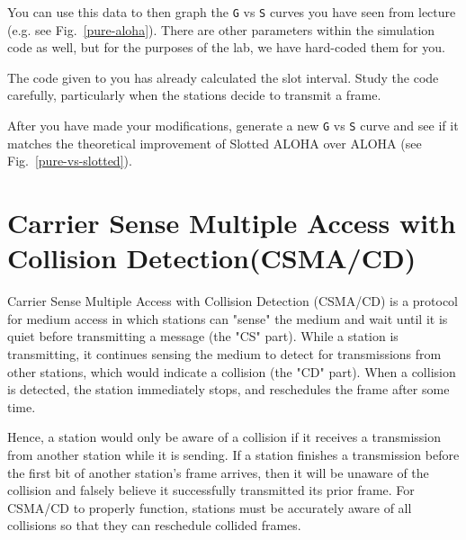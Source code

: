 \documentclass[11pt]{article}
\begin{document}
You can use this data to then graph the \texttt{G} vs \texttt{S} curves you have seen from lecture (e.g. see Fig.~\ref{pure-aloha}).
There are other parameters within the simulation code as well, but for the purposes of the lab, we have hard-coded them for you.

The code given to you has already calculated the slot interval.
Study the code carefully, particularly when the stations decide to transmit a frame.


After you have made your modifications, generate a new \texttt{G} vs \texttt{S} curve and see if it matches the theoretical improvement of Slotted ALOHA over ALOHA (see Fig.~\ref{pure-vs-slotted}).




\section{Carrier Sense Multiple Access with Collision Detection\newline(CSMA/CD)}
\label{sec:csma-cd}
Carrier Sense Multiple Access with Collision Detection (CSMA/CD) is a protocol for medium access in which stations can "sense" the medium and wait until it is quiet before transmitting a message (the "CS" part).
While a station is transmitting, it continues sensing the medium to detect for transmissions from other stations, which would indicate a collision (the "CD" part).
When a collision is detected, the station immediately stops, and reschedules the frame after some time.

Hence, a station would only be aware of a collision if it receives a transmission from another station while it is sending.
If a station finishes a transmission before the first bit of another station's frame arrives, then it will be unaware of the collision and falsely believe it successfully transmitted its prior frame.
For CSMA/CD to properly function, stations must be accurately aware of all collisions so that they can reschedule collided frames.
\end{document}

